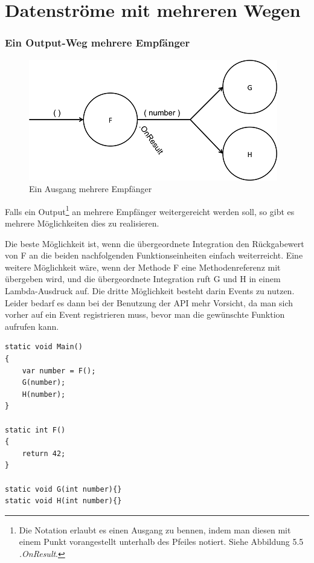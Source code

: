 \section{Datenströme mit mehreren Wegen}

\subsubsection{Ein Output-Weg mehrere Empfänger}

\begin{figure}[H]
	\centering
	\includegraphics[width=.7\linewidth]{./img/diagramOut1to2.png}
	\caption{Ein Ausgang mehrere Empfänger}
\end{figure}


Falls ein Output\footnote{Die Notation erlaubt es einen Ausgang zu bennen, indem man diesen mit einem Punkt vorangestellt unterhalb des Pfeiles notiert. Siehe Abbildung 5.5 \textit{.OnResult}.} an mehrere Empfänger weitergereicht werden soll, so gibt es
mehrere Möglichkeiten dies zu realisieren.


Die beste Möglichkeit ist, wenn die übergeordnete Integration den Rückgabewert
von F an die beiden nachfolgenden Funktionseinheiten einfach weiterreicht.
Eine weitere Möglichkeit wäre, wenn der Methode F eine Methodenreferenz mit übergeben wird,
und die übergeordnete Integration ruft G und H in einem Lambda-Ausdruck auf.
Die dritte Möglichkeit besteht darin Events zu nutzen.
Leider bedarf es dann bei der Benutzung der API mehr Vorsicht, da man sich vorher auf ein Event registrieren muss, bevor man
die gewünschte Funktion aufrufen kann.
\\
\begin{lstlisting}[caption= Mehrere Empfänger eines Outputs]
static void Main()
{ 
    var number = F();
    G(number);
    H(number);
}

static int F()
{
	return 42;
}

static void G(int number){}
static void H(int number){}
\end{lstlisting}




